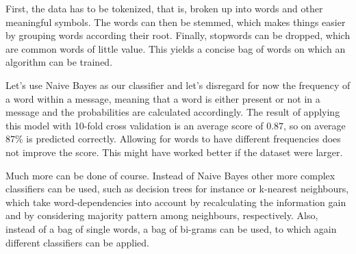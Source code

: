 \documentclass{llncs}
\begin{document}
First, the data has to be tokenized, that is, broken up into words and other meaningful symbols. The words can then be stemmed, which makes things easier by grouping words according their root. Finally, stopwords can be dropped, which are common words of little value. This yields a concise bag of words on which an algorithm can be trained.

Let's use Naive Bayes as our classifier and let's disregard for now the frequency of a word within a message, meaning that a word is either present or not in a message and the probabilities are calculated accordingly. The result of applying this model with 10-fold cross validation is an average score of $0.87$, so on average $87\%$ is predicted correctly. Allowing for words to have different frequencies does not improve the score. This might have worked better if the dataset were larger.

Much more can be done of course. Instead of Naive Bayes other more complex classifiers can be used, such as decision trees for instance or k-nearest neighbours, which take word-dependencies into account by recalculating the information gain and by considering majority pattern among neighbours, respectively. Also, instead of a bag of single words, a bag of bi-grams can be used, to which again different classifiers can be applied.    

                        


\end{document}
